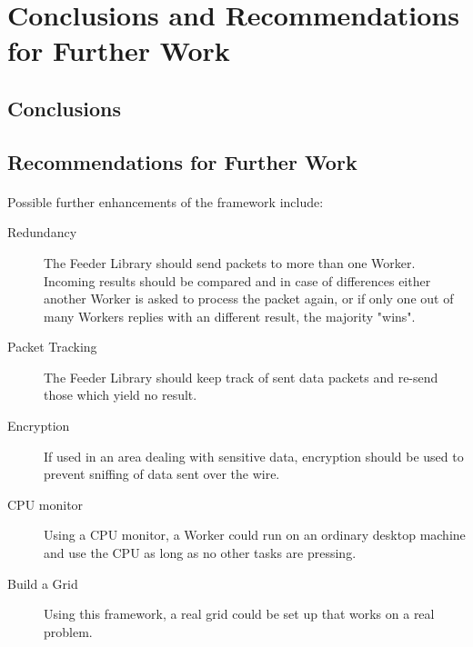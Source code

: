 \section{Conclusions and Recommendations for Further Work}
\paragraph{}

\subsection{Conclusions}
\paragraph{}



\subsection{Recommendations for Further Work}
\paragraph{}
Possible further enhancements of the framework include:
\begin{description}
\item[Redundancy] The Feeder Library should send packets to more than one Worker. Incoming results should be compared and in case of differences either another Worker is asked to process the packet again, or if only one out of many Workers replies with an different result, the majority "wins".
\item[Packet Tracking] The Feeder Library should keep track of sent data packets and re-send those which yield no result.
\item[Encryption] If used in an area dealing with sensitive data, encryption should be used to prevent sniffing of data sent over the wire.
\item[CPU monitor] Using a CPU monitor, a Worker could run on an ordinary desktop machine and use the CPU as long as no other tasks are pressing.
\item[Build a Grid] Using this framework, a real grid could be set up that works on a real problem.
\end{description}
